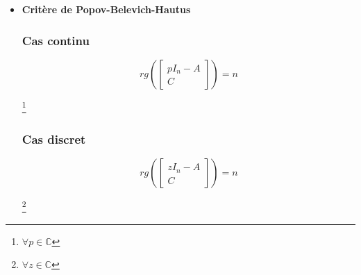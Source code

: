 {{{{{{\begin{itemize}
        \subsubsection{Cas continu}
        Soit
        \[ Q_{c} = 
        \begin{bmatrix}
            C \\
            CA \\
            ... \\
            CA^{n-1}
        \end{bmatrix}
        \in M_{n}(\mathbb{C})
        \]
        \begin{center}
             \footnote{$n$ lignes indépendantes. La matrice $Q_{0}$ est formée par les vecteurs ligne $(CA^{i})_{i \in \{1,n-1 \}}$ avec $A$ matrice carrée de taille $n$ et $C$ vecteur ligne de taille $n$}
        \end{center}
        \subsubsection{Cas discret}
        \[
        Q_{0} =
        \begin{bmatrix}
            C \\
            CF \\
            ... \\
            CF^{n-1}
        \end{bmatrix} 
        \in M_{n}(\mathbb{C})
        \]
        \begin{center}
        \end{center}
    \item \textbf{Critère de Popov-Belevich-Hautus}
        \subsubsection{Cas continu}
        \begin{center}
            \[
            rg(
                \begin{bmatrix}
                    pI_{n} - A \\
                    C
                \end{bmatrix}
            ) = n
            \] 
        \end{center}
        \footnote{$\forall p \in \mathbb{C}$}
        \subsubsection{Cas discret}
        \begin{center}
            \[
            rg(
                \begin{bmatrix}
                    zI_{n} - A \\
                    C
                \end{bmatrix}
            ) = n
            \]
        \end{center}
        \footnote{$\forall z \in \mathbb{C}$}
\end{itemize}
\newpage
}}}}}}
